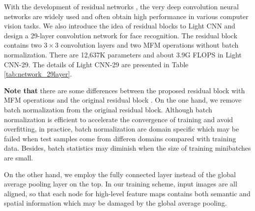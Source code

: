 \documentclass[journal,transmag]{IEEEtran}
\begin{document}
With the development of residual networks \cite{HeZRS16}, the very deep convolution neural networks are widely used and often obtain high performance in various computer vision tasks. We also introduce the idea of residual blocks to Light CNN and design a 29-layer convolution network for face recognition. The residual block contains two $3\times 3$ convolution layers and two MFM operations without batch normalization. There are 12,637K parameters and about 3.9G FLOPS in Light CNN-29. The details of Light CNN-29 are presented in Table \ref{tab:network_29layer}.

\textbf{Note that} there are some differences between the proposed residual block with MFM operations and the original residual block \cite{HeZRS16}. On the one hand, we remove batch normalization from the original residual block. Although batch normalization is efficient to accelerate the convergence of training and avoid overfitting, in practice, batch normalization are domain specific which may be failed when test samples come from differen domains compared with training data. Besides, batch statistics may diminish when the size of training minibatches are small.

On the other hand, we employ the fully connected layer instead of the global average pooling layer on the top. In our training scheme, input images are all aligned, so that each node for high-level feature maps contains both semantic and spatial information which may be damaged by the global average pooling.
\end{document}
